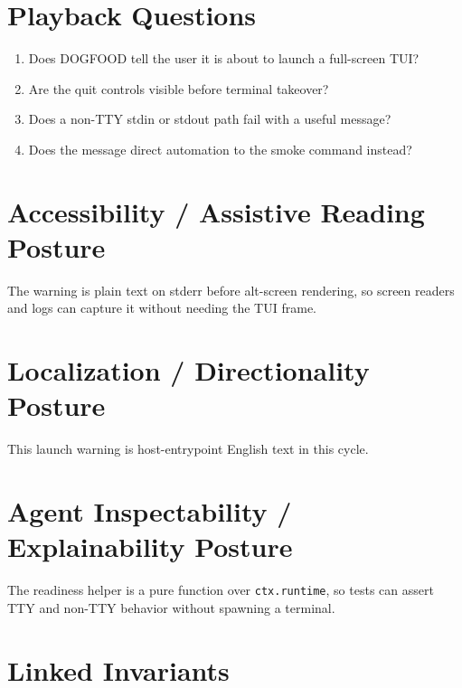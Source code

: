 \section{Playback Questions}\label{record-119-playback-questions}

\begin{enumerate}
\def\labelenumi{\arabic{enumi}.}
\tightlist
\item
  Does DOGFOOD tell the user it is about to launch a full-screen TUI?
\item
  Are the quit controls visible before terminal takeover?
\item
  Does a non-TTY stdin or stdout path fail with a useful message?
\item
  Does the message direct automation to the smoke command instead?
\end{enumerate}

\section{Accessibility / Assistive Reading Posture}\label{record-119-accessibility-assistive-reading-posture}

The warning is plain text on stderr before alt-screen rendering, so screen readers and logs can capture it without needing the TUI frame.

\section{Localization / Directionality Posture}\label{record-119-localization-directionality-posture}

This launch warning is host-entrypoint English text in this cycle.

\section{Agent Inspectability / Explainability Posture}\label{record-119-agent-inspectability-explainability-posture}

The readiness helper is a pure function over \texttt{c\allowbreak{}t\allowbreak{}x\allowbreak{}.\allowbreak{}r\allowbreak{}u\allowbreak{}n\allowbreak{}t\allowbreak{}i\allowbreak{}m\allowbreak{}e}, so tests can assert TTY and non-TTY behavior without spawning a terminal.

\section{Linked Invariants}\label{record-119-linked-invariants}

